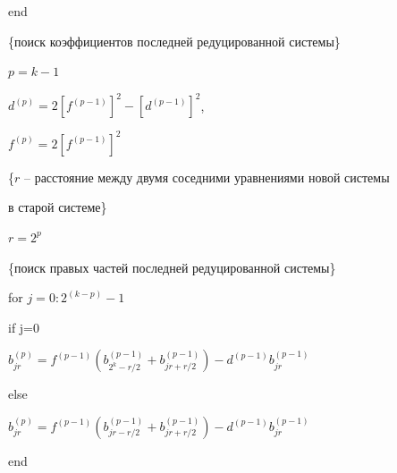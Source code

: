 {end



\{поиск коэффициентов последней редуцированной системы\}



$p=k-1$





$d^{(p)}=2[f^{(p-1)}]^2-[d^{(p-1)}]^2 $,



$f^{(p)}=2[f^{(p-1)}]^2$



\{$r$ -- расстояние между двумя соседними уравнениями новой системы 



в старой системе\}



$r=2^p$



\{поиск правых частей последней редуцированной системы\}





\hspace{.5cm} for $j=0:2^{(k-p)}-1$



\hspace{.5cm} \hspace{.5cm}

if j=0



\hspace{.5cm}\hspace{.5cm}\hspace{.5cm}

$b_{jr}^{(p)}=f^{(p-1)}(b_{2^{k}-r/2}^{(p-1)}+b_{jr+r/2}^{(p-1)})-d^{(p-1)}b_{jr}^{(p-1)}$



\hspace{.5cm}\hspace{.5cm} else



\hspace{.5cm}\hspace{.5cm}\hspace{.5cm}

$b_{jr}^{(p)}=f^{(p-1)}(b_{jr-r/2}^{(p-1)}+b_{jr+r/2}^{(p-1)})-d^{(p-1)}b_{jr}^{(p-1)}$



\hspace{.5cm}\hspace{.5cm}end



}
